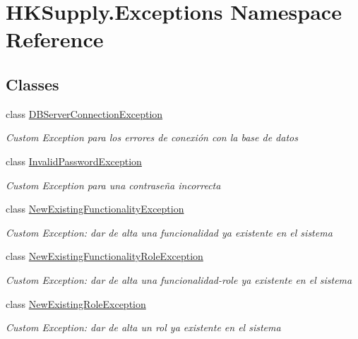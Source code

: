 \hypertarget{namespace_h_k_supply_1_1_exceptions}{}\section{H\+K\+Supply.\+Exceptions Namespace Reference}
\label{namespace_h_k_supply_1_1_exceptions}
\subsection*{Classes}
\begin{DoxyCompactItemize}
\item 
class \mbox{\hyperlink{class_h_k_supply_1_1_exceptions_1_1_d_b_server_connection_exception}{D\+B\+Server\+Connection\+Exception}}
\begin{DoxyCompactList}\small\item\em Custom Exception para los errores de conexión con la base de datos \end{DoxyCompactList}\item 
class \mbox{\hyperlink{class_h_k_supply_1_1_exceptions_1_1_invalid_password_exception}{Invalid\+Password\+Exception}}
\begin{DoxyCompactList}\small\item\em Custom Exception para una contraseña incorrecta \end{DoxyCompactList}\item 
class \mbox{\hyperlink{class_h_k_supply_1_1_exceptions_1_1_new_existing_functionality_exception}{New\+Existing\+Functionality\+Exception}}
\begin{DoxyCompactList}\small\item\em Custom Exception\+: dar de alta una funcionalidad ya existente en el sistema \end{DoxyCompactList}\item 
class \mbox{\hyperlink{class_h_k_supply_1_1_exceptions_1_1_new_existing_functionality_role_exception}{New\+Existing\+Functionality\+Role\+Exception}}
\begin{DoxyCompactList}\small\item\em Custom Exception\+: dar de alta una funcionalidad-\/role ya existente en el sistema \end{DoxyCompactList}\item 
class \mbox{\hyperlink{class_h_k_supply_1_1_exceptions_1_1_new_existing_role_exception}{New\+Existing\+Role\+Exception}}
\begin{DoxyCompactList}\small\item\em Custom Exception\+: dar de alta un rol ya existente en el sistema \end{DoxyCompactList}\item 

\end{DoxyCompactItemize}

